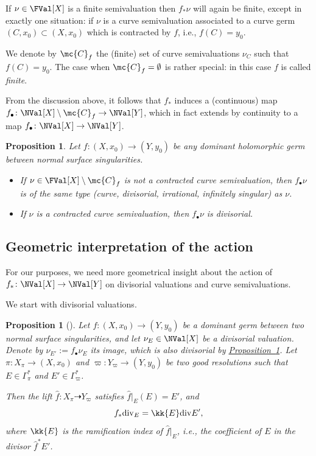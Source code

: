 \documentclass[11 pt, twoside, a4paper]{amsart}
\newcommand{\dgvert}[1]{\varGamma_{#1}^*}
\newtheorem{prop}[thm]{Proposition}
\theoremstyle{definition}
\theoremstyle{definition}
\newcommand{\divi}{\mathrm{div}}
\newcommand{\VC}[1]{\mc{C}_{#1}}
\newcommand{\refprop}[1]{\hyperref[prop:#1]{Proposition~\ref*{prop:#1}}}
\begin{document}
If $\nu\in \FVal[X]$ is a finite semivaluation then $f_*\nu$ will again be finite, except in exactly one situation: if $\nu$ is a curve semivaluation associated to a curve germ $(C, x_0)\subset (X, x_0)$ which is contracted by $f$, i.e., $f(C)=y_0$.

We denote by $\VC{f}$ the (finite) set of curve semivaluations $\nu_C$ such that $f(C)=y_0$. The case when $\VC{f}=\emptyset$ is rather special: in this case $f$ is called \emph{finite}.



From the discussion above, it follows that $f_*$ induces a (continuous) map $f_\bullet \colon \NVal[X] \setminus \VC{f} \to \NVal[Y]$, which in fact extends by continuity to a map $f_\bullet \colon \NVal[X] \to \NVal[Y]$.


\begin{prop}\label{prop:propertiesfbullet}
Let $f\colon (X,x_0)\to (Y,y_0)$ be any dominant holomorphic germ between normal surface singularities.
\begin{itemize}
\item
If $\nu\in \FVal[X] \setminus \VC{f}$ is not a contracted curve semivaluation, then $f_\bullet\nu$ is of the same type (curve, divisorial, irrational, infinitely singular) as $\nu$.

\item If $\nu$ is a contracted curve semivaluation, then $f_\bullet\nu$ is divisorial.
\end{itemize}

\end{prop}


\subsection{Geometric interpretation of the action}\label{ssec:geomactionval}

For our purposes, we need more geometrical insight about the action of $f_* \colon \NVal[X] \to \NVal[Y]$ on divisorial valuations and curve semivaluations.

We start with divisorial valuations.

\begin{prop}[{\cite[Prop. 2.5]{favre-jonsson:eigenval}}]\label{prop:imagedivi}
Let $f\colon (X,x_0) \to (Y,y_0)$ be a dominant germ between two normal surface singularities, and let $\nu_E \in \NVal[X]$ be a divisorial valuation.
Denote by $\nu_{E'}:= f_\bullet \nu_E$ its image, which is also divisorial by \refprop{propertiesfbullet}. 
Let $\pi \colon X_{\pi}\to (X,x_0)$ and $\varpi \colon Y_{\varpi}\to (Y,y_0)$ be two good resolutions such that $E \in \dgvert{\pi}$ and $E' \in \dgvert{\varpi}$.

Then the lift $\hat{f} \colon X_\pi \dashrightarrow Y_\varpi$ satisfies $\hat{f}|_{E} (E)=E'$, and
\[
f_* \divi_E = \kk{E} \divi E'\text{,}
\] 
where $\kk{E}$ is the ramification index of $\hat{f}|_E$, i.e., the coefficient of $E$ in the divisor $\hat{f}^*E'$.
\end{prop}
\end{document}
